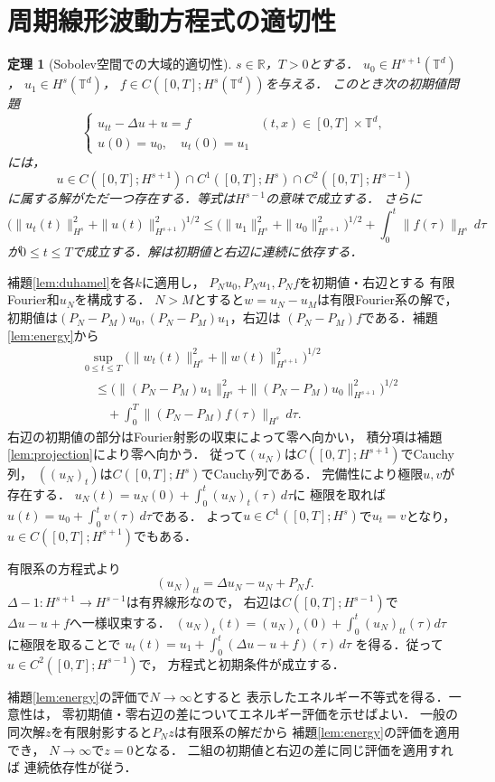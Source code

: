 \documentclass[a5paper,10pt,onecolumn]{jsarticle}
\makeatletter
\theoremstyle{mathnotetheorem}
\newtheorem{theorem}{定理}[section]
\renewcommand{\proofname}{証明}
\renewenvironment{proof}[1][\proofname]{%
  \par\pushQED{\qed}\normalfont\topsep4\p@\@plus2\p@\relax
  \trivlist\item[\hskip\labelsep\bfseries #1]\ignorespaces
}{\popQED\endtrivlist\@endpefalse}
\makeatother
\begin{document}
\section{周期線形波動方程式の適切性}
\begin{theorem}[Sobolev空間での大域的適切性]\label{thm:wellposed}
$s\in\mathbb R$，$T>0$とする．
$u_0\in H^{s+1}(\mathbb T^d)$，
$u_1\in H^s(\mathbb T^d)$，
$f\in C([0,T];H^s(\mathbb T^d))$を与える．
このとき次の初期値問題
\[
 \begin{cases}
 u_{tt}-\Delta u+u=f &(t,x)\in[0,T]\times\mathbb T^d,\\
 u(0)=u_0,\quad u_t(0)=u_1
 \end{cases}
\]
には，
\[
 u\in C([0,T];H^{s+1})\cap C^1([0,T];H^s)
       \cap C^2([0,T];H^{s-1})
\]
に属する解がただ一つ存在する．等式は$H^{s-1}$の意味で成立する．
さらに
\[
 \bigl(\|u_t(t)\|_{H^s}^2+\|u(t)\|_{H^{s+1}}^2\bigr)^{1/2}
 \le
 \bigl(\|u_1\|_{H^s}^2+\|u_0\|_{H^{s+1}}^2\bigr)^{1/2}
 +\int_0^t\|f(\tau)\|_{H^s}\,d\tau
\]
が$0\le t\le T$で成立する．解は初期値と右辺に連続に依存する．
\end{theorem}
\begin{proof}
補題\ref{lem:duhamel}を各$k$に適用し，
$P_Nu_0,P_Nu_1,P_Nf$を初期値・右辺とする
有限Fourier和$u_N$を構成する．
$N>M$とすると$w=u_N-u_M$は有限Fourier系の解で，
初期値は$(P_N-P_M)u_0,(P_N-P_M)u_1$，右辺は
$(P_N-P_M)f$である．補題\ref{lem:energy}から
\[
 \begin{aligned}
 &\sup_{0\le t\le T}
 \bigl(\|w_t(t)\|_{H^s}^2+\|w(t)\|_{H^{s+1}}^2\bigr)^{1/2}\\
 &\quad\le
 \bigl(\|(P_N-P_M)u_1\|_{H^s}^2
 +\|(P_N-P_M)u_0\|_{H^{s+1}}^2\bigr)^{1/2}\\
 &\qquad+\int_0^T\|(P_N-P_M)f(\tau)\|_{H^s}\,d\tau.
 \end{aligned}
\]
右辺の初期値の部分はFourier射影の収束によって零へ向かい，
積分項は補題\ref{lem:projection}により零へ向かう．
従って$(u_N)$は$C([0,T];H^{s+1})$でCauchy列，
$((u_N)_t)$は$C([0,T];H^s)$でCauchy列である．
完備性により極限$u,v$が存在する．
$u_N(t)=u_N(0)+\int_0^t (u_N)_t(\tau)\,d\tau$に
極限を取れば$u(t)=u_0+\int_0^t v(\tau)\,d\tau$である．
よって$u\in C^1([0,T];H^s)$で$u_t=v$となり，
$u\in C([0,T];H^{s+1})$でもある．

有限系の方程式より
\[
 (u_N)_{tt}=\Delta u_N-u_N+P_Nf.
\]
$\Delta-1:H^{s+1}\to H^{s-1}$は有界線形なので，
右辺は$C([0,T];H^{s-1})$で
$\Delta u-u+f$へ一様収束する．
$(u_N)_t(t)=(u_N)_t(0)+\int_0^t(u_N)_{tt}(\tau)d\tau$
に極限を取ることで
$u_t(t)=u_1+\int_0^t(\Delta u-u+f)(\tau)\,d\tau$
を得る．従って$u\in C^2([0,T];H^{s-1})$で，
方程式と初期条件が成立する．

補題\ref{lem:energy}の評価で$N\to\infty$とすると
表示したエネルギー不等式を得る．一意性は，
零初期値・零右辺の差についてエネルギー評価を示せばよい．
一般の同次解$z$を有限射影すると$P_Nz$は有限系の解だから
補題\ref{lem:energy}の評価を適用でき，
$N\to\infty$で$z=0$となる．
二組の初期値と右辺の差に同じ評価を適用すれば
連続依存性が従う．
\end{proof}
\end{document}
